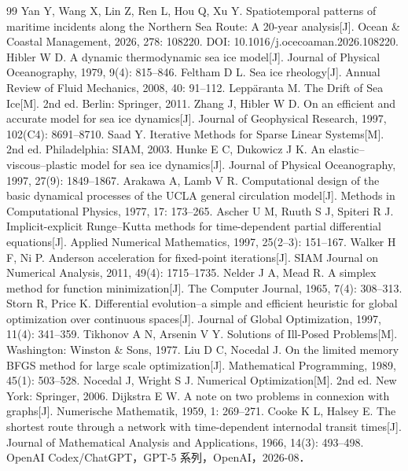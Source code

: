 \documentclass[UTF8]{ctexart}
\begin{document}
\begin{thebibliography}{99}
 Yan Y, Wang X, Lin Z, Ren L, Hou Q, Xu Y. Spatiotemporal patterns of maritime incidents along the Northern Sea Route: A 20-year analysis[J]. Ocean \& Coastal Management, 2026, 278: 108220. DOI: 10.1016/j.ocecoaman.2026.108220.
 Hibler W D. A dynamic thermodynamic sea ice model[J]. Journal of Physical Oceanography, 1979, 9(4): 815--846.
 Feltham D L. Sea ice rheology[J]. Annual Review of Fluid Mechanics, 2008, 40: 91--112.
 Leppäranta M. The Drift of Sea Ice[M]. 2nd ed. Berlin: Springer, 2011.
 Zhang J, Hibler W D. On an efficient and accurate model for sea ice dynamics[J]. Journal of Geophysical Research, 1997, 102(C4): 8691--8710.
 Saad Y. Iterative Methods for Sparse Linear Systems[M]. 2nd ed. Philadelphia: SIAM, 2003.
 Hunke E C, Dukowicz J K. An elastic--viscous--plastic model for sea ice dynamics[J]. Journal of Physical Oceanography, 1997, 27(9): 1849--1867.
 Arakawa A, Lamb V R. Computational design of the basic dynamical processes of the UCLA general circulation model[J]. Methods in Computational Physics, 1977, 17: 173--265.
 Ascher U M, Ruuth S J, Spiteri R J. Implicit-explicit Runge--Kutta methods for time-dependent partial differential equations[J]. Applied Numerical Mathematics, 1997, 25(2--3): 151--167.
 Walker H F, Ni P. Anderson acceleration for fixed-point iterations[J]. SIAM Journal on Numerical Analysis, 2011, 49(4): 1715--1735.
 Nelder J A, Mead R. A simplex method for function minimization[J]. The Computer Journal, 1965, 7(4): 308--313.
 Storn R, Price K. Differential evolution--a simple and efficient heuristic for global optimization over continuous spaces[J]. Journal of Global Optimization, 1997, 11(4): 341--359.
 Tikhonov A N, Arsenin V Y. Solutions of Ill-Posed Problems[M]. Washington: Winston \& Sons, 1977.
 Liu D C, Nocedal J. On the limited memory BFGS method for large scale optimization[J]. Mathematical Programming, 1989, 45(1): 503--528.
 Nocedal J, Wright S J. Numerical Optimization[M]. 2nd ed. New York: Springer, 2006.
 Dijkstra E W. A note on two problems in connexion with graphs[J]. Numerische Mathematik, 1959, 1: 269--271.
 Cooke K L, Halsey E. The shortest route through a network with time-dependent internodal transit times[J]. Journal of Mathematical Analysis and Applications, 1966, 14(3): 493--498.
 OpenAI Codex/ChatGPT，GPT-5 系列，OpenAI，2026-08．
\end{thebibliography}
\end{document}
